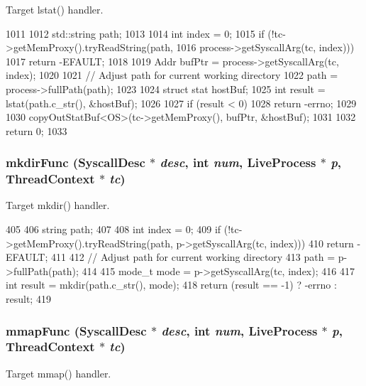Target lstat() handler. 


\begin{DoxyCode}
1011 {
1012     std::string path;
1013 
1014     int index = 0;
1015     if (!tc->getMemProxy().tryReadString(path,
1016                 process->getSyscallArg(tc, index))) {
1017         return -EFAULT;
1018     }
1019     Addr bufPtr = process->getSyscallArg(tc, index);
1020 
1021     // Adjust path for current working directory
1022     path = process->fullPath(path);
1023 
1024     struct stat hostBuf;
1025     int result = lstat(path.c_str(), &hostBuf);
1026 
1027     if (result < 0)
1028         return -errno;
1029 
1030     copyOutStatBuf<OS>(tc->getMemProxy(), bufPtr, &hostBuf);
1031 
1032     return 0;
1033 }
\end{DoxyCode}
\hypertarget{syscall__emul_8hh_aeada7d30dbed17e022348fdce3bdebc6}{
\subsubsection[{mkdirFunc}]{ mkdirFunc ({\bf SyscallDesc} $\ast$ {\em desc}, \/  int {\em num}, \/  {\bf LiveProcess} $\ast$ {\em p}, \/  {\bf ThreadContext} $\ast$ {\em tc})}}
\label{syscall__emul_8hh_aeada7d30dbed17e022348fdce3bdebc6}


Target mkdir() handler. 


\begin{DoxyCode}
405 {
406     string path;
407 
408     int index = 0;
409     if (!tc->getMemProxy().tryReadString(path, p->getSyscallArg(tc, index)))
410         return -EFAULT;
411 
412     // Adjust path for current working directory
413     path = p->fullPath(path);
414 
415     mode_t mode = p->getSyscallArg(tc, index);
416 
417     int result = mkdir(path.c_str(), mode);
418     return (result == -1) ? -errno : result;
419 }
\end{DoxyCode}
\hypertarget{syscall__emul_8hh_ab55f07f32ed5eff0cbfb28d3da9d05c4}{
\subsubsection[{mmapFunc}]{ mmapFunc ({\bf SyscallDesc} $\ast$ {\em desc}, \/  int {\em num}, \/  {\bf LiveProcess} $\ast$ {\em p}, \/  {\bf ThreadContext} $\ast$ {\em tc})}}
\label{syscall__emul_8hh_ab55f07f32ed5eff0cbfb28d3da9d05c4}
Target mmap() handler.

